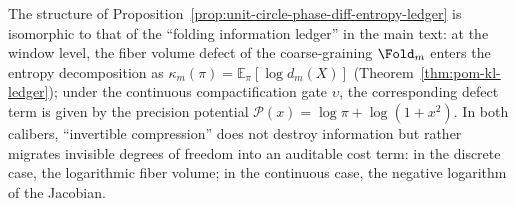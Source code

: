 \begin{remark}\label{rem:unit-circle-phase-precision-ledger-vs-pom}
The structure of Proposition~\ref{prop:unit-circle-phase-diff-entropy-ledger} is isomorphic to that of the ``folding information ledger'' in the main text: at the window level, the fiber volume defect of the coarse-graining \(\Fold_m\) enters the entropy decomposition as \(\kappa_m(\pi)=\mathbb{E}_\pi[\log d_m(X)]\) (Theorem~\ref{thm:pom-kl-ledger});
under the continuous compactification gate \(\upsilon\), the corresponding defect term is given by the precision potential \(\mathcal{P}(x)=\log\pi+\log(1+x^2)\).
In both calibers, ``invertible compression'' does not destroy information but rather migrates invisible degrees of freedom into an auditable cost term: in the discrete case, the logarithmic fiber volume; in the continuous case, the negative logarithm of the Jacobian.
\end{remark}

